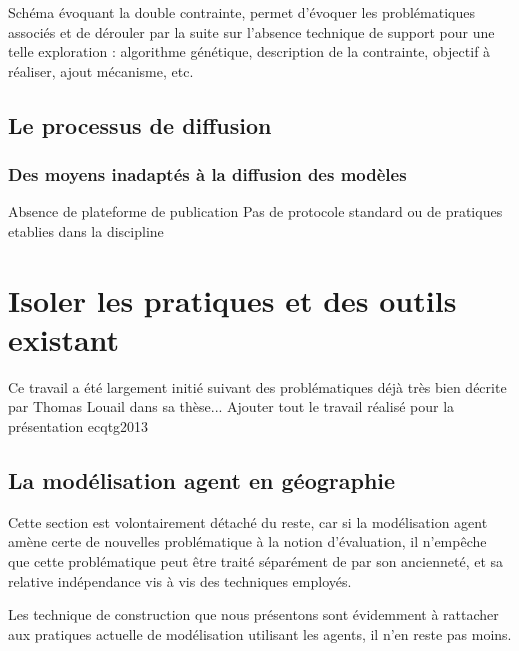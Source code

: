 Schéma évoquant la double contrainte, permet d'évoquer les problématiques associés et de dérouler par la suite sur l'absence technique de support pour une telle exploration : algorithme génétique, description de la contrainte, objectif à réaliser, ajout mécanisme, etc.

\subsection{Le processus de diffusion}
\subsubsection{Des moyens inadaptés à la diffusion des modèles}
Absence de plateforme de publication
Pas de protocole standard ou de pratiques etablies dans la discipline

\section {Isoler les pratiques et des outils existant}

Ce travail a été largement initié suivant des problématiques déjà très bien décrite par Thomas Louail dans sa thèse...
Ajouter tout le travail réalisé pour la présentation ecqtg2013


\subsection {La modélisation agent en géographie} 

Cette section est volontairement détaché du reste, car si la modélisation agent amène certe de nouvelles problématique à la notion d'évaluation, il n'empêche que cette problématique peut être traité séparément de par son ancienneté, et sa relative indépendance vis à vis des techniques employés.

Les technique de construction que nous présentons sont évidemment à rattacher aux pratiques actuelle de modélisation utilisant les agents, il n'en reste pas moins.

\stopcontents[chapters]




